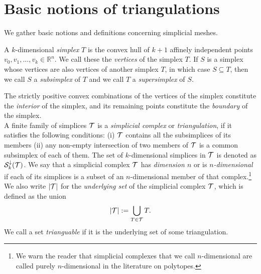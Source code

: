 \documentclass[a4paper]{article}
\begin{document}
\section{Basic notions of triangulations}\label{section:triangulations}

We gather basic notions and definitions concerning simplicial meshes. 
  
A ${k}$-dimensional \emph{simplex} $T$ is the convex hull of ${k}+1$ affinely independent points $v_0, v_1, \ldots, v_{{k}} \in \mathbb{R}^{n}$. We call these the \emph{vertices} of the simplex $T$. 
If $S$ is a simplex whose vertices are also vertices of another simplex $T$, in which case $S \subseteq T$, 
then we call $S$ a \textit{subsimplex} of $T$ and we call $T$ a \textit{supersimplex} of $S$. 

The strictly positive convex combinations of the vertices of the simplex constitute the \textit{ interior} of the simplex,
and its remaining points constitute the \textit{boundary} of the simplex.
\\

A finite family of simplices ${\mathcal T}$ is a \emph{simplicial complex} or \emph{triangulation}, if it satisfies the following conditions: 
(i) ${\mathcal T}$ contains all the subsimplices of its members (ii) any non-empty intersection of two members of ${\mathcal T}$ is a common subsimplex of each of them. 
The set of $k$-dimensional simplices in ${\mathcal T}$ is denoted as ${\mathcal S}^{\downarrow}_{{k}}({\mathcal T})$. 
We say that a simplicial complex ${\mathcal T}$ has \textit{dimension $n$} or is \textit{$n$-dimensional} if each of its simplices is a subset of an $n$-dimensional member of that complex.\footnote{We warn the reader that simplicial complexes that we call $n$-dimensional are called purely $n$-dimensional in the literature on polytopes.} 
We also write $\left| {\mathcal T} \right|$ for the \textit{underlying set} of the simplicial complex ${\mathcal T}$, which is defined as the union 
\begin{align*}
    \left| {\mathcal T} \right| := \bigcup_{ T \in {\mathcal T} } T
    .
\end{align*}
We call a set \textit{trianguable} if it is the underlying set of some triangulation. 
\end{document}
